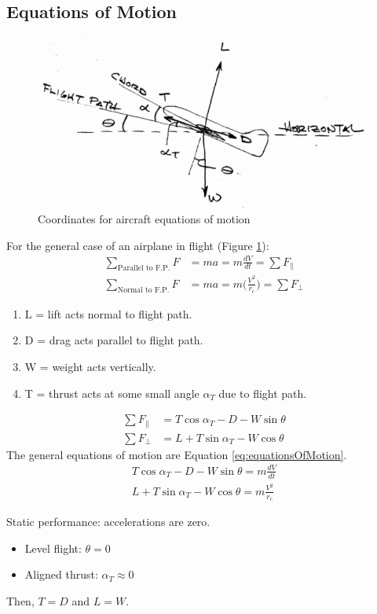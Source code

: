 \documentclass[draft=false, titlepage]{article}
\begin{document}
\subsection{Equations of Motion}
\begin{figure}[ht]
	\centering
	\includegraphics[width=0.6\linewidth]{Figures/p65_equationsOfMotion.PNG}
	\caption{Coordinates for aircraft equations of motion}
	\label{fig:p65_equationsOfMotion}
\end{figure}
For the general case of an airplane in flight (Figure \ref{fig:p65_equationsOfMotion}):
\begin{align*}
\sum_{\text{Parallel to F.P.}} F &= ma = m\frac{dV}{dt} = \sum F_\parallel\\
\sum_{\text{Normal to F.P.}} F &= ma = m\Big(\frac{V^2}{r_c}\Big) = \sum F_\perp
\end{align*}
\begin{enumerate}
	\item L = lift acts normal to flight path.
	\item D = drag acts parallel to flight path.
	\item W = weight acts vertically.
	\item T = thrust acts at some small angle $\alpha_T$ due to flight path.
\end{enumerate}
\begin{align*}
\sum F_\parallel &= T\cos\alpha_T - D - W\sin\theta\\
\sum F_\perp &= L + T\sin\alpha_T - W\cos\theta
\end{align*}
The general equations of motion are Equation \ref{eq:equationsOfMotion}.
\begin{align}
T\cos\alpha_T - D - W\sin\theta = m\frac{dV}{dt}\\
L + T\sin\alpha_T - W\cos\theta = m\frac{V^2}{r_c}
\label{eq:equationsOfMotion}
\end{align}

Static performance: accelerations are zero.
\begin{itemize}
	\item Level flight: $\theta = 0$
	\item Aligned thrust: $\alpha_T \approx 0$
\end{itemize}
Then, $\boxed{T=D}$ and $\boxed{L=W}$.
\end{document}
